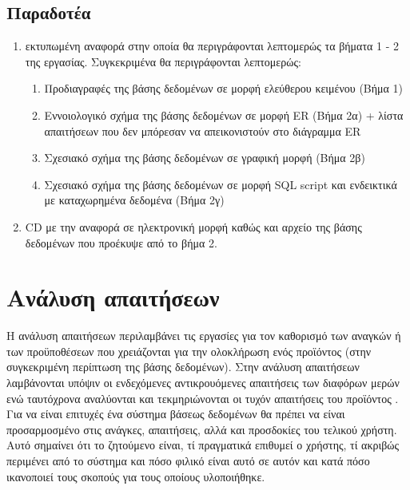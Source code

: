 \documentclass{assignment}
\begin{document}
\subsection{Παραδοτέα}

\begin{enumerate}

  \item εκτυπωμένη αναφορά στην οποία θα περιγράφονται λεπτομερώς τα βήματα 1 - 2 της εργασίας. Συγκεκριμένα θα περιγράφονται λεπτομερώς:

  \begin{enumerate}[i]
    \item Προδιαγραφές της βάσης δεδομένων σε μορφή ελεύθερου κειμένου (Βήμα 1)
    \item Εννοιολογικό σχήμα της βάσης δεδομένων σε μορφή ER (Βήμα 2α) + λίστα απαιτήσεων που δεν μπόρεσαν να απεικονιστούν στο διάγραμμα ER
    \item Σχεσιακό σχήμα της βάσης δεδομένων σε γραφική μορφή (Βήμα 2β)
    \item Σχεσιακό σχήμα της βάσης δεδομένων σε μορφή SQL script και ενδεικτικά  με καταχωρημένα δεδομένα (Βήμα 2γ)
  \end{enumerate}

  \item CD με την αναφορά σε ηλεκτρονική μορφή καθώς και αρχείο  της βάσης δεδομένων που προέκυψε από το βήμα 2.

\end{enumerate}

\section{Ανάλυση απαιτήσεων}

Η ανάλυση απαιτήσεων περιλαμβάνει τις εργασίες για τον καθορισμό των αναγκών ή των προϋποθέσεων που χρειάζονται για την ολοκλήρωση ενός προϊόντος (στην συγκεκριμένη περίπτωση της βάσης δεδομένων). Στην ανάλυση απαιτήσεων λαμβάνονται υπόψιν οι ενδεχόμενες αντικρουόμενες απαιτήσεις των διαφόρων μερών ενώ ταυτόχρονα αναλύονται και τεκμηριώνονται οι τυχόν απαιτήσεις του προϊόντος \cite{wiki:requirement_analysis}. Για να είναι επιτυχές ένα σύστημα βάσεως δεδομένων θα πρέπει να είναι προσαρμοσμένο στις ανάγκες, απαιτήσεις, αλλά και προσδοκίες του τελικού χρήστη. Αυτό σημαίνει ότι το ζητούμενο είναι, τί πραγματικά επιθυμεί ο χρήστης, τί ακριβώς περιμένει από το σύστημα και πόσο φιλικό είναι αυτό σε αυτόν και κατά πόσο ικανοποιεί τους σκοπούς για τους οποίους υλοποιήθηκε.
\end{document}
